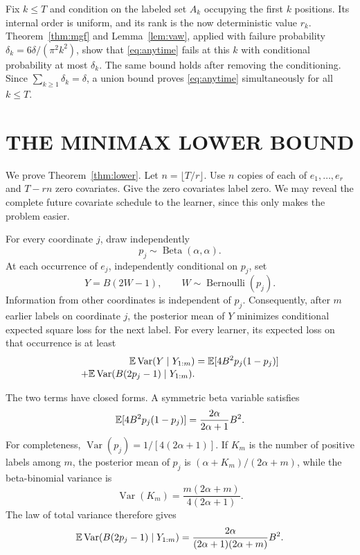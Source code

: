 Fix $k\le T$ and condition on the labeled set $A_k$ occupying the first $k$ positions. Its internal order is uniform, and its rank is the now deterministic value $r_k$. Theorem~\ref{thm:mgf} and Lemma~\ref{lem:vaw}, applied with failure probability $\delta_k=6\delta/(\pi^2k^2)$, show that \eqref{eq:anytime} fails at this $k$ with conditional probability at most $\delta_k$. The same bound holds after removing the conditioning. Since $\sum_{k\ge1}\delta_k=\delta$, a union bound proves \eqref{eq:anytime} simultaneously for all $k\le T$.

\section{THE MINIMAX LOWER BOUND}
\label{app:lower}

We prove Theorem~\ref{thm:lower}. Let $n=\lfloor T/r\rfloor$. Use $n$ copies of each of $e_1,\ldots,e_r$ and $T-rn$ zero covariates. Give the zero covariates label zero. We may reveal the complete future covariate schedule to the learner, since this only makes the problem easier.

For every coordinate $j$, draw independently
\[
 p_j\sim\operatorname{Beta}(\alpha,\alpha).
\]
At each occurrence of $e_j$, independently conditional on $p_j$, set
\[
 Y=B(2W-1),
 \qquad W\sim\operatorname{Bernoulli}(p_j).
\]
Information from other coordinates is independent of $p_j$. Consequently, after $m$ earlier labels on coordinate $j$, the posterior mean of $Y$ minimizes conditional expected square loss for the next label. For every learner, its expected loss on that occurrence is at least
\begin{align}
 \mathbb E\operatorname{Var}(Y\mid Y_{1:m})
 &=\mathbb E[4B^2p_j(1-p_j)]\notag\\[-2pt]
 +\mathbb E\operatorname{Var}(B(2p_j-1)\mid Y_{1:m}).
 \label{eq:bayes-decomposition}
\end{align}

The two terms have closed forms. A symmetric beta variable satisfies
\begin{equation}
 \mathbb E[4B^2p_j(1-p_j)]
 =\frac{2\alpha}{2\alpha+1}B^2.
 \label{eq:irreducible}
\end{equation}
For completeness, $\operatorname{Var}(p_j)=1/[4(2\alpha+1)]$. If $K_m$ is the number of positive labels among $m$, the posterior mean of $p_j$ is
$(\alpha+K_m)/(2\alpha+m)$, while the beta-binomial variance is
\[
 \operatorname{Var}(K_m)=
 \frac{m(2\alpha+m)}{4(2\alpha+1)}.
\]
The law of total variance therefore gives
\begin{equation}
 \mathbb E\operatorname{Var}(B(2p_j-1)\mid Y_{1:m})
 =\frac{2\alpha}{(2\alpha+1)(2\alpha+m)}B^2.
 \label{eq:posterior-variance}
\end{equation}

